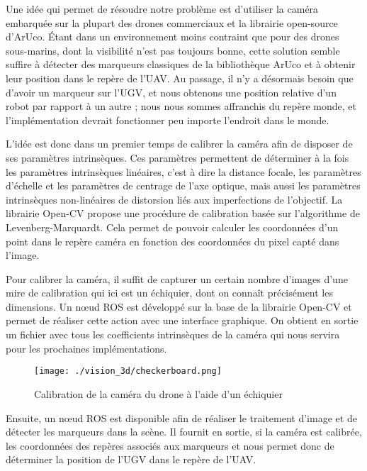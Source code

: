     Une idée qui permet de résoudre notre problème est d’utiliser la caméra embarquée sur la plupart des drones commerciaux et la librairie open-source d’ArUco. Étant dans un environnement moins contraint que pour des drones sous-marins, dont la visibilité n’est pas toujours bonne, cette solution semble suffire à détecter des marqueurs classiques de la bibliothèque ArUco et à obtenir leur position dans le repère de l’UAV. Au passage, il n’y a désormais besoin que d’avoir un marqueur sur l’UGV, et nous obtenons une position relative d’un robot par rapport à un autre ; nous nous sommes affranchis du repère monde, et l’implémentation devrait fonctionner peu importe l’endroit dans le monde.

    L’idée est donc dans un premier temps de calibrer la caméra afin de disposer de ses paramètres intrinsèques. Ces paramètres permettent de déterminer à la fois les paramètres intrinsèques linéaires, c’est à dire la distance focale, les paramètres d'échelle et les paramètres de centrage de l’axe optique, mais aussi les paramètres intrinsèques non-linéaires de distorsion liés aux imperfections de l’objectif. La librairie Open-CV propose une procédure de calibration basée sur l’algorithme de Levenberg-Marquardt. Cela permet de pouvoir calculer les coordonnées d’un point dans le repère caméra en fonction des coordonnées du pixel capté dans l’image.

    Pour calibrer la caméra, il suffit de capturer un certain nombre d'images d’une mire de calibration qui ici est un échiquier, dont on connaît précisément les dimensions. Un nœud ROS est développé sur la base de la librairie Open-CV et permet de réaliser cette action avec une interface graphique. On obtient en sortie un fichier avec tous les coefficients intrinsèques de la caméra qui nous servira pour les prochaines implémentations.

    \begin{figure}[!htb]
        \centering
        \texttt{[image: ./vision\_3d/checkerboard.png]}
        \caption{Calibration de la caméra du drone à l'aide d'un échiquier}
        \label{fig:checkerboard}
    \end{figure}

    Ensuite, un nœud ROS est disponible afin de réaliser le traitement d’image et de détecter les marqueurs dans la scène. Il fournit en sortie, si la caméra est calibrée, les coordonnées des repères associés aux marqueurs et nous permet donc de déterminer la position de l’UGV dans le repère de l’UAV.

